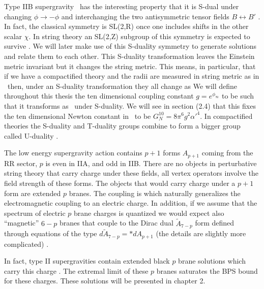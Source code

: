 Type IIB supergravity \gssugra\ 
 has the interesting property that
it is S-dual  under changing $ \phi \rightarrow - \phi$ and
interchanging the two antisymmetric tensor fields $
B \leftrightarrow B' $ \schslr. In fact, the classical symmetry is
SL(2,R) once one includes shifts in the other scalar $\chi$.
In string theory an SL(2,Z) subgroup of this symmetry
is expected to survive \hull . We will later make use of
this S-duality symmetry to generate solutions and
relate them to each other. 
This S-duality transformation leaves the Einstein metric 
invariant but it changes the string metric. 
This means, in particular, that if we have a compactified theory
and the radii are measured in string metric as in 
\virasoro\ then, under an S-duality transformation they 
all change as 
\eqn{}
We will define throughout this thesis the ten dimensional coupling
constant $g= e^{\phi_{\infty} } $ 
to be such that it transforms as \sduality\ under S-duality.
We will see in section (2.4)  that this fixes the ten dimensional
Newton constant in \actiontwoa\ to be 
$ G^{10}_N = 8 \pi^6 g^2 \alpha'^4  $.
In compactified theories the S-duality and T-duality groups
combine to form a bigger group called U-duality \hull . 






The low energy supergravity action contains $p+1$ forms
$A_{p+1}$ 
coming from the RR sector, $p$ is even in IIA, and odd in IIB.
 There are no objects in perturbative string theory that
carry charge under these fields, all vertex operators 
involve the field strength of these forms. The objects that
would carry charge under a $p+1$ form are extended $p$ branes.
The coupling  is 
\eqn{} 
which naturally generalizes the electromagnetic coupling to
an electric charge. 
In addition, if we assume that the spectrum of electric
$p$ brane charges is quantized we would expect also 
``magnetic'' $6-p$ branes that couple to the 
Dirac dual $\tilde A_{7-p}$ form defined through 
equations of the type $ d \tilde A_{7-p} = \ast  d A_{p+1} $ (the
details are slightly more complicated) \teitel . 

In fact,
 type II supergravities contain extended black $p$ brane
solutions which carry this charge \hs . 
The extremal limit of these $p$ branes saturates the
BPS bound for these charges. These solutions will be
presented in chapter 2. 

